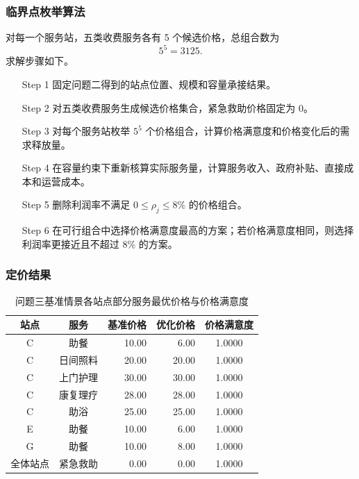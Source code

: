 \subsubsection{临界点枚举算法}

对每一个服务站，五类收费服务各有 5 个候选价格，总组合数为
\begin{equation}
5^5=3125.
\end{equation}
求解步骤如下。

\begin{enumerate}
    \item[Step 1] 固定问题二得到的站点位置、规模和容量承接结果。
    \item[Step 2] 对五类收费服务生成候选价格集合，紧急救助价格固定为 0。
    \item[Step 3] 对每个服务站枚举 $5^5$ 个价格组合，计算价格满意度和价格变化后的需求释放量。
    \item[Step 4] 在容量约束下重新核算实际服务量，计算服务收入、政府补贴、直接成本和运营成本。
    \item[Step 5] 删除利润率不满足 $0\leq \rho_j\leq 8\%$ 的价格组合。
    \item[Step 6] 在可行组合中选择价格满意度最高的方案；若价格满意度相同，则选择利润率更接近且不超过 $8\%$ 的方案。
\end{enumerate}

\subsubsection{定价结果}

\begin{table}[H]
\centering
\caption{问题三基准情景各站点部分服务最优价格与价格满意度}
\label{tab:p3_price}
\begin{tabular}{c c r r c}
\toprule
站点 & 服务 & 基准价格 & 优化价格 & 价格满意度 \\
\midrule
C & 助餐 & 10.00 & 6.00 & 1.0000 \\
C & 日间照料 & 20.00 & 20.00 & 1.0000 \\
C & 上门护理 & 30.00 & 30.00 & 1.0000 \\
C & 康复理疗 & 28.00 & 28.00 & 1.0000 \\
C & 助浴 & 25.00 & 25.00 & 1.0000 \\
E & 助餐 & 10.00 & 6.00 & 1.0000 \\
G & 助餐 & 10.00 & 8.00 & 1.0000 \\
全体站点 & 紧急救助 & 0.00 & 0.00 & 1.0000 \\
\bottomrule
\end{tabular}
\end{table}


